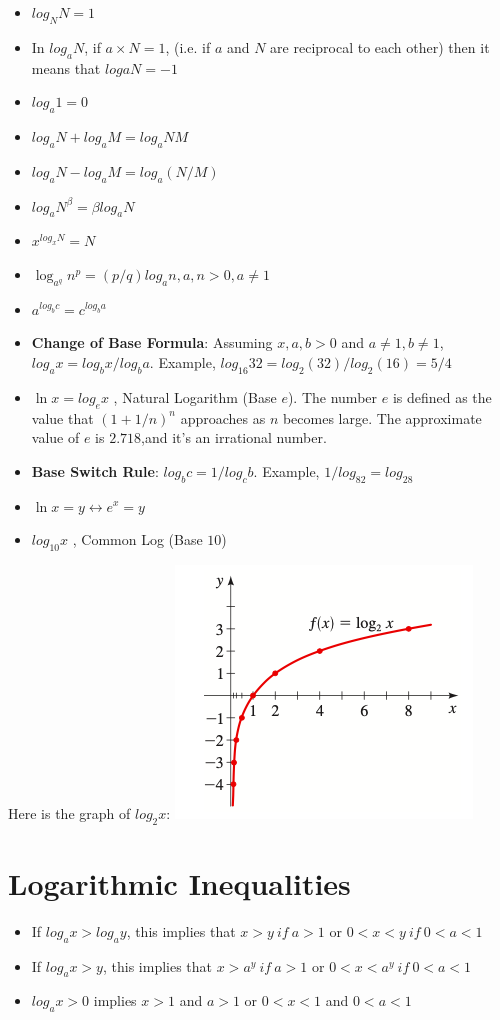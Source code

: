 \documentclass{book}
\begin{document}
	\begin{itemize}
		\item $log_NN = 1$
		\item In $log_aN$, if $a \times N =1$, (i.e. if $a$ and $N$ are reciprocal to each other) then it means that $logaN = -1$ 
		\item $log_a1 = 0$
		\item $log_aN + log_aM = log_a{NM}$
		\item $log_aN - log_aM = log_a{(N/M)}$
		\item $log_aN^\beta = \beta log_aN$
		\item$x^{log_xN} = N$
		\item $\log_{a^q}n^p = (p/q)log_an, a,n > 0, a \ne 1$
		\item $a^{log_bc} = c^{log_ba}$
		\item \textbf{Change of Base Formula}: Assuming $x,a,b >0$ and $ a \ne1, b \ne 1$, $log_ax = log_bx/log_ba$. Example, $log_{16}32 = log_2(32)/log_2(16) = 5/4$
		\item $\ln x = log_ex$ , Natural Logarithm (Base $e$). The number $e$ is defined as the value that $(1 + 1/n)^n$ approaches as $n$ becomes large. The approximate value of $e$ is $2.718$,and it's an irrational number.
		\item \textbf{Base Switch Rule}: $log_bc = 1/log_cb$. Example, $1/log_82 =log_28$
		\item $\ln x = y \leftrightarrow e^x = y$
		\item $log_{10}x$ , Common Log (Base $10$)
	\end{itemize}
	
	Here is the graph of $log_2x$: 
	\includegraphics[scale=0.6]{loggraph}
	
	\section{Logarithmic Inequalities}
	\begin{itemize}
		\item If $log_ax > log_ay$, this implies that $x>y \: if \: a>1$ or $0<x<y \: if \: 0<a<1$
		\item If $log_ax >y$, this implies that $x>a^y \: if \: a>1$ or $0<x<a^y \: if \: 0<a<1$
		\item $log_ax > 0$ implies $x>1$ and $a>1$ or $0<x<1$ and $0<a<1$
	\end{itemize}
\end{document}
